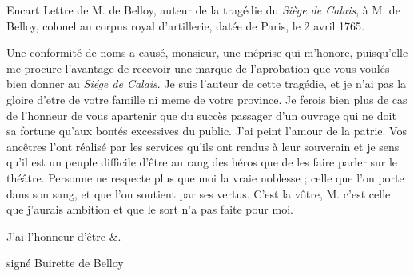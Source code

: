                      \begin{diary}{Encart}{} Lettre de M. de
                                 Belloy,
                              auteur de la tragédie
                              du \emph{Siège de Calais}, à
                              M. de Belloy, colonel au
                              corpus royal d'artillerie,
                              datée de Paris, le 2 avril 1765. \bigskip

                 Une conformité de noms a
                              causé, monsieur, une méprise
                              qui m'honore, puisqu'elle me
                              procure l'avantage de recevoir
                              une marque de l'aprobation
                              que vous voulés bien donner au
                              \emph{Siége de Calais}. Je suis l'auteur
                              de cette tragédie, et je n'ai pas
                              la gloire d'etre de votre famille
                              ni meme de votre province. Je
                              ferois bien plus de cas de l'honneur
                              de vous apartenir que du succès
                              passager d'un ouvrage qui ne doit sa fortune qu'aux
                              bontés
                              excessives du public. J'ai peint
                              l'amour de la patrie. Vos ancêtres
                              l'ont réalisé par les services
                              qu'ils ont rendus à leur souverain
                              et je sens qu'il est un peuple
                              difficile d'être au rang des
                              héros que de les faire parler
                              sur le théâtre. Personne ne
                              respecte plus que moi la vraie
                              noblesse ; celle que l'on porte dans
                              son sang, et que l'on soutient par
                              ses vertus. C'est la vôtre, M.
                              c'est celle que j'aurais ambition
                              et que le sort n'a pas faite pour
                              moi. \bigskip


                                 J'ai l'honneur d'être \&.\bigskip

                \begin{flushright}
                                 signé Buirette de
                                    Belloy
                              \end{flushright}\end{diary}

